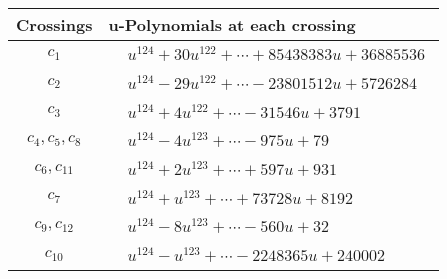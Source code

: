 \documentclass[1p]{elsarticle_modified}
\theoremstyle{definition}
\begin{document}
\begin{tabular}{m{50pt}|m{274pt}}
Crossings & \hspace{64pt}u-Polynomials at each crossing \\
\hline $$\begin{aligned}c_{1}\end{aligned}$$&$\begin{aligned}
&u^{124}+30 u^{122}+\cdots+85438383 u+36885536
\end{aligned}$\\
\hline $$\begin{aligned}c_{2}\end{aligned}$$&$\begin{aligned}
&u^{124}-29 u^{122}+\cdots-23801512 u+5726284
\end{aligned}$\\
\hline $$\begin{aligned}c_{3}\end{aligned}$$&$\begin{aligned}
&u^{124}+4 u^{122}+\cdots-31546 u+3791
\end{aligned}$\\
\hline $$\begin{aligned}c_{4},c_{5},c_{8}\end{aligned}$$&$\begin{aligned}
&u^{124}-4 u^{123}+\cdots-975 u+79
\end{aligned}$\\
\hline $$\begin{aligned}c_{6},c_{11}\end{aligned}$$&$\begin{aligned}
&u^{124}+2 u^{123}+\cdots+597 u+931
\end{aligned}$\\
\hline $$\begin{aligned}c_{7}\end{aligned}$$&$\begin{aligned}
&u^{124}+u^{123}+\cdots+73728 u+8192
\end{aligned}$\\
\hline $$\begin{aligned}c_{9},c_{12}\end{aligned}$$&$\begin{aligned}
&u^{124}-8 u^{123}+\cdots-560 u+32
\end{aligned}$\\
\hline $$\begin{aligned}c_{10}\end{aligned}$$&$\begin{aligned}
&u^{124}- u^{123}+\cdots-2248365 u+240002
\end{aligned}$\\
\hline
\end{tabular}\\~\\
\end{document}
